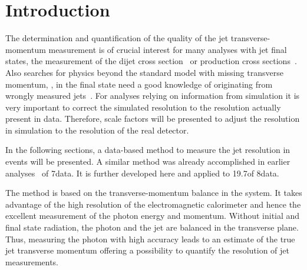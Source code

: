 \chapter{Introduction}
\label{res:ch:Introduction}

The determination and quantification of the quality of the jet transverse-momentum measurement is of crucial interest for many analyses with jet final states, \eg the measurement of the dijet cross section~\cite{bib:CMS:QCD_measurements} or \ttbar production cross sections~\cite{bib:CMS:TopCrossSection_8TeV}. 
Also searches for physics beyond the standard model with missing transverse momentum, \PTm, in the final state need a good knowledge of \PTm originating from wrongly measured jets~\cite{bib:CMS:RA2_8TeV,bib:CMS:MT2_8TeV,bib:CMS:AlphaT_8TeV}.
For analyses relying on information from simulation it is very important to correct the simulated resolution to the resolution actually present in data.
Therefore, scale factors will be presented to adjust the resolution in simulation to the resolution of the real detector.  
  
In the following sections, a data-based method to measure the jet \pt resolution in \GAMJET events will be presented. 
A similar method was already accomplished in earlier analyses~\cite{bib:CMS:JERCPaper_2011,CMS:PAS:JETResolution_7TeV} of 7\tev data.  
It is further developed here and applied to 19.7\fbinv of 8\tev data.

The method is based on the transverse-momentum balance in the \GAMJET system. 
It takes advantage of the high resolution of the electromagnetic calorimeter and hence the excellent measurement of the photon energy and momentum.
Without initial and final state radiation, the photon and the jet are balanced in the transverse plane. 
Thus, measuring the photon \pt with high accuracy leads to an estimate of the true jet transverse momentum offering a possibility to quantify the resolution of jet \pt measurements.


